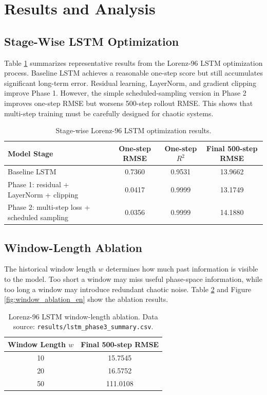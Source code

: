 \documentclass[a4paper,12pt]{article}
\begin{document}
\section{Results and Analysis}

\subsection{Stage-Wise LSTM Optimization}

Table \ref{tab:lstm_phase_en} summarizes representative results from the Lorenz-96 LSTM optimization process. Baseline LSTM achieves a reasonable one-step score but still accumulates significant long-term error. Residual learning, LayerNorm, and gradient clipping improve Phase 1. However, the simple scheduled-sampling version in Phase 2 improves one-step RMSE but worsens 500-step rollout RMSE. This shows that multi-step training must be carefully designed for chaotic systems.

\begin{table}[htbp]
\centering
\caption{Stage-wise Lorenz-96 LSTM optimization results.}
\label{tab:lstm_phase_en}
\small
\begin{tabularx}{\textwidth}{@{}>{\raggedright\arraybackslash}Xccc@{}}
\toprule
Model Stage & One-step RMSE & One-step $R^2$ & Final 500-step RMSE \\
\midrule
Baseline LSTM & 0.7360 & 0.9531 & 13.9662 \\
Phase 1: residual + LayerNorm + clipping & 0.0417 & 0.9999 & 13.1749 \\
Phase 2: multi-step loss + scheduled sampling & 0.0356 & 0.9999 & 14.1880 \\
\bottomrule
\end{tabularx}
\end{table}

\subsection{Window-Length Ablation}

The historical window length $w$ determines how much past information is visible to the model. Too short a window may miss useful phase-space information, while too long a window may introduce redundant chaotic noise. Table \ref{tab:window_ablation_en} and Figure \ref{fig:window_ablation_en} show the ablation results.

\begin{table}[htbp]
\centering
\caption{Lorenz-96 LSTM window-length ablation. Data source: \texttt{results/lstm\_phase3\_summary.csv}.}
\label{tab:window_ablation_en}
\begin{tabular}{cc}
\toprule
Window Length $w$ & Final 500-step RMSE \\
\midrule
10 & 15.7545 \\
20 & 16.5752 \\
50 & 111.0108 \\
\bottomrule
\end{tabular}
\end{table}
\end{document}
